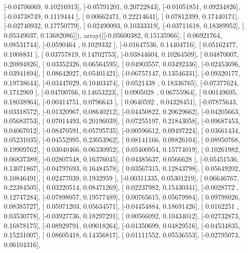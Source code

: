 \documentclass{article}
\begin{document}
       [-0.04706069,  0.10216913],
       [-0.05791201,  0.20722843],
       [-0.01051851,  0.09234826],
       [-0.04738749,  0.1119444 ],
       [ 0.00662471,  0.22214641],
       [ 0.07812399,  0.17440171],
       [-0.02740932,  0.17750779],
       [ 0.02490093,  0.10333319],
       [-0.03711618,  0.18389952],
       [ 0.05349037,  0.13682086]]), array([[-0.05600382,  0.15135966],
       [ 0.06921764,  0.08531744],
       [-0.0590464 ,  0.1029332 ],
       [-0.01647536,  0.14404716],
       [ 0.05162477,  0.1008831 ],
       [ 0.03757819,  0.14702753],
       [-0.03844604,  0.10264509],
       [ 0.04870007,  0.20894826],
       [ 0.03352326,  0.06564595],
       [ 0.04903557,  0.03492336],
       [-0.02453696,  0.03941894],
       [ 0.08642027,  0.05401421],
       [-0.06757147,  0.13546331],
       [-0.09320177,  0.19738644],
       [-0.03447029,  0.10403474],
       [ 0.0521438 ,  0.18336765],
       [-0.07377624,  0.1712969 ],
       [-0.04700766,  0.14653223],
       [ 0.0905028 ,  0.06755964],
       [ 0.00149695,  0.18038964],
       [-0.00414751,  0.0796643 ],
       [ 0.0640592 ,  0.04328451],
       [-0.07875643,  0.03318572],
       [-0.01320967,  0.08640212],
       [-0.04450822,  0.20629662],
       [-0.04205663,  0.05683753],
       [ 0.07014493,  0.20196039],
       [ 0.07255197,  0.21843058],
       [-0.09687453,  0.04067012],
       [-0.08470591,  0.05795735],
       [-0.00596612,  0.09497224],
       [ 0.03661434,  0.05231035],
       [-0.04552995,  0.23053962],
       [ 0.08141166,  0.08826104],
       [ 0.08950768,  0.19909762],
       [ 0.03040466,  0.06330952],
       [ 0.05400954,  0.15774019],
       [ 0.10261982,  0.06837389],
       [-0.02807548,  0.16376045],
       [ 0.04385637,  0.0566628 ],
       [-0.05451536,  0.13071867],
       [-0.04797693,  0.16484578],
       [ 0.03567315,  0.12843798],
       [ 0.05649202,  0.10846491],
       [ 0.02477039,  0.1932959 ],
       [-0.00311335,  0.05301219],
       [ 0.06646767,  0.22384505],
       [ 0.03220514,  0.08471269],
       [ 0.02237982,  0.15430341],
       [-0.0028772 ,  0.12747284],
       [-0.07898057,  0.19577489],
       [ 0.00765615,  0.05679984],
       [ 0.09798026,  0.08385727],
       [ 0.05971203,  0.05634571],
       [-0.04454884,  0.18691426],
       [ 0.0162251 ,  0.03530778],
       [-0.03927736,  0.18297291],
       [ 0.00566092,  0.10434012],
       [-0.02732873,  0.16878175],
       [-0.08929791,  0.09018264],
       [-0.01350699,  0.04829516],
       [-0.04534835,  0.15231007],
       [ 0.08605418,  0.14356817],
       [ 0.01111552,  0.05536553],
       [-0.02795073,  0.06104316],
\end{document}
